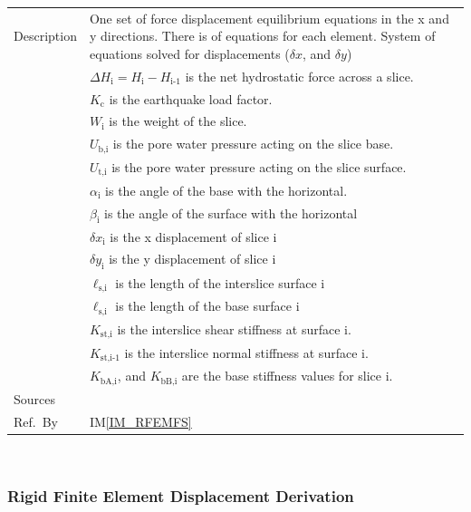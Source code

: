 \documentclass[12pt]{article}
\newcommand{\iref}[1]{IM\ref{#1}}
\begin{document}
\begin{minipage}{\textwidth}
\begin{tabular}{| p{1.5cm} | p{14cm} |}
\hline Description & One set of force displacement equilibrium
equations in the x and y directions. There is of equations for each
element. System of equations solved for displacements ($\delta x$, and
$\delta y$) \\
& $\Delta H_{\text{i}} = H_{\text{i}}-H_{\text{i-1}}$ is the net
hydrostatic force across a slice.\\
& $K_{\text{c}}$ is the earthquake load factor.\\
& $W_{\text{i}}$ is the weight of the slice.\\
& $U_{\text{b,i}}$ is the pore water pressure acting on the slice
base.\\
& $U_{\text{t,i}}$ is the pore water pressure acting on the slice
surface. \\
& $\alpha_{\text{i}}$ is the angle of the base with the horizontal. \\
& $\beta_{\text{i}}$ is the angle of the surface with the horizontal\\
& $\delta x_{\text{i}}$ is the x displacement of slice $\text{i}$\\
& $\delta y_{\text{i}}$ is the y displacement of slice $\text{i}$\\
& $ \ell_{\text{s,i}}$ is the length of the interslice surface
$\text{i}$\\
& $ \ell_{\text{s,i}}$ is the length of the base surface $\text{i}$\\
& $ K_{\text{st,i}}$ is the interslice shear stiffness at surface
$\text{i}$.\\
& $ K_{\text{st,i-1}}$ is the interslice normal stiffness at surface
$\text{i}$.\\
& $ K_{\text{bA,i}}$, and $ K_{\text{bB,i}}$ are the base stiffness
values for slice $\text{i}$.\\

\hline Sources& \cite{StolleGuo}\\

\hline Ref.\ By & \iref{IM_RFEMFS} \\

\hline
\end{tabular}
\end{minipage}\\


\subsubsection*{Rigid Finite Element
  Displacement Derivation}
\end{document}
